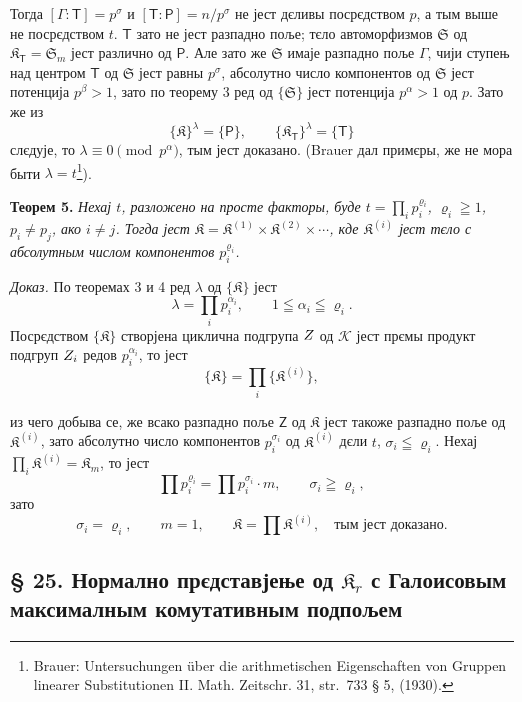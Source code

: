 \documentclass[11pt]{article}
\newcommand{\srcfn}[2]{\footnote{#2}}
\newcommand{\foreign}[1]{#1}
\begin{document}
Тогда \([\Gamma:\mathsf{T}]=p^\sigma\) и \([\mathsf{T}:\mathsf P]=n/p^\sigma\) не јест дєливы посрєдством \(p\), а тым выше не посрєдством \(t\). \(\mathsf{T}\) зато не јест разпадно поље; тєло автоморфизмов \(\mathfrak S\) од \(\mathfrak K_{\mathsf{T}}=\mathfrak S_m\) јест различно од \(\mathsf P\). Але зато же \(\mathfrak S\) имаје разпадно поље \(\Gamma\), чији ступењ над центром \(\mathsf{T}\) од \(\mathfrak S\) јест равны \(p^\sigma\), абсолутно число компонентов од \(\mathfrak S\) јест потенција \(p^\beta>1\), зато по теорему 3 ред од \(\{\mathfrak S\}\) јест потенција \(p^\alpha>1\) од \(p\). Зато же из
\[
\{\mathfrak K\}^{\lambda}=\{\mathsf P\},
\qquad
\{\mathfrak K_{\mathsf{T}}\}^{\lambda}=\{\mathsf{T}\}
\]
слєдује, то \(\lambda\equiv0\pmod {p^\alpha}\), тым јест доказано. (Brauer дал примєры, же не мора быти \(\lambda=t\)\srcfn{1}{\foreign{Brauer: Untersuchungen über die arithmetischen Eigenschaften von Gruppen linearer Substitutionen II. Math. Zeitschr. 31, str.~733 § 5, (1930).}}).

\textbf{Теорем 5.} \emph{Нехај \(t\), разложено на просте факторы, буде \(t=\prod_i p_i^{\varrho_i}\), \(\varrho_i\geqq1\), \(p_i\ne p_j\), ако \(i\ne j\). Тогда јест \(\mathfrak K=\mathfrak K^{(1)}\times\mathfrak K^{(2)}\times\cdots\), кде \(\mathfrak K^{(i)}\) јест тєло с абсолутным числом компонентов \(p_i^{\varrho_i}\).}

\emph{Доказ.} По теоремах 3 и 4 ред \(\lambda\) од \(\{\mathfrak K\}\) јест
\[
\lambda=\prod_i p_i^{\alpha_i},\qquad 1\leqq\alpha_i\leqq\varrho_i.
\]
Посрєдством \(\{\mathfrak K\}\) створјена циклична подгрупа \(\mathscr \mathsf{Z}\) од \(\mathscr K\) јест прємы продукт подгруп \(\mathscr \mathsf{Z}_i\) редов \(p_i^{\alpha_i}\), то јест
\[
\{\mathfrak K\}=\prod_i\{\mathfrak K^{(i)}\},
\]

из чего добыва се, же всако разпадно поље \(\mathsf{Z}\) од \(\mathfrak K\) јест такоже разпадно поље од \(\mathfrak K^{(i)}\), зато абсолутно число компонентов \(p_i^{\sigma_i}\) од \(\mathfrak K^{(i)}\) дєли \(t\), \(\sigma_i\leqq\varrho_i\). Нехај \(\prod_i \mathfrak K^{(i)}=\mathfrak K_m\), то јест
\[
\prod p_i^{\varrho_i}=\prod p_i^{\sigma_i}\cdot m,
\qquad
\sigma_i\geqq\varrho_i,
\]
зато
\[
\sigma_i=\varrho_i,\qquad m=1,\qquad
\mathfrak K=\prod \mathfrak K^{(i)},
\quad\text{тым јест доказано.}
\]

\subsection*{§ 25. Нормално прєдставјење од \(\mathfrak K_r\) с Галоисовым максималным комутативным подпољем\protect\footnotemark}
\label{normaldarstellung-von-r_r-mit-galoisschem-maximalem-kommutativem-teilkoerper-1}
\end{document}
